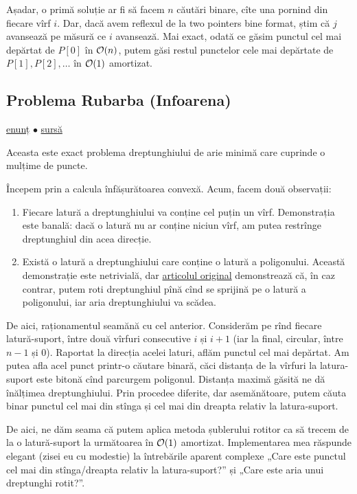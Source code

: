\documentclass[../main.tex]{subfiles}
\begin{document}
Așadar, o primă soluție ar fi să facem $n$ căutări binare, cîte una pornind din fiecare vîrf $i$. Dar, dacă avem reflexul de la two pointers bine format, știm că $j$ avansează pe măsură ce $i$ avansează. Mai exact, odată ce găsim punctul cel mai depărtat de $P[0]$ în $\mathcal{O}(n)$, putem găsi restul punctelor cele mai depărtate de $P[1], P[2], \dots$ în $\mathcal{O}(1)$ amortizat.

\subsection{Problema Rubarba (Infoarena)}
\label{problem:rubarba}

\href{https://infoarena.ro/problema/rubarba}{enunț}
$\bullet$
\hyperref[code:rubarba]{sursă}

Aceasta este exact problema dreptunghiului de arie minimă care cuprinde o mulțime de puncte.

Începem prin a calcula înfășurătoarea convexă. Acum, facem două observații:

\begin{enumerate}
  \item Fiecare latură a dreptunghiului va conține cel puțin un vîrf. Demonstrația este banală: dacă o latură nu ar conține niciun vîrf, am putea restrînge dreptunghiul din acea direcție.

  \item Există o latură a dreptunghiului care conține o latură a poligonului. Această demonstrație este netrivială, dar \href{https://dl.acm.org/doi/10.1145/360881.360919}{articolul original} demonstrează că, în caz contrar, putem roti dreptunghiul pînă cînd se sprijină pe o latură a poligonului, iar aria dreptunghiului va scădea.
\end{enumerate}

De aici, raționamentul seamănă cu cel anterior. Considerăm pe rînd fiecare latură-suport, între două vîrfuri consecutive $i$ și $i+1$ (iar la final, circular, între $n-1$ și $0$). Raportat la direcția acelei laturi, aflăm punctul cel mai depărtat. Am putea afla acel punct printr-o căutare binară, căci distanța de la vîrfuri la latura-suport este bitonă cînd parcurgem poligonul. Distanța maximă găsită ne dă înălțimea dreptunghiului. Prin procedee diferite, dar asemănătoare, putem căuta binar punctul cel mai din stînga și cel mai din dreapta relativ la latura-suport.

De aici, ne dăm seama că putem aplica metoda șublerului rotitor ca să trecem de la o latură-suport la următoarea în $\mathcal{O}(1)$ amortizat. Implementarea mea răspunde elegant (zisei eu cu modestie) la întrebările aparent complexe „Care este punctul cel mai din stînga/dreapta relativ la latura-suport?” și „Care este aria unui dreptunghi rotit?”.
\end{document}
